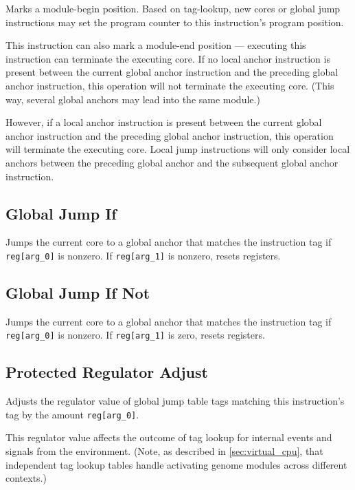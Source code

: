 
Marks a module-begin position.
Based on tag-lookup, new cores or global jump instructions may set the program counter to this instruction's program position.

This instruction can also mark a module-end position --- executing this instruction can terminate the executing core.
If no local anchor instruction is present between the current global anchor instruction and the preceding global anchor instruction, this operation will not terminate the executing core.
(This way, several global anchors may lead into the same module.)

However, if a local anchor instruction is present between the current global anchor instruction and the preceding global anchor instruction, this operation will terminate the executing core.
Local jump instructions will only consider local anchors between the preceding global anchor and the subsequent global anchor instruction.

\subsection{Global Jump If}


Jumps the current core to a global anchor that matches the instruction tag if \texttt{reg[arg\_0]} is nonzero.
If \texttt{reg[arg\_1]} is nonzero, resets registers.

\subsection{Global Jump If Not}


Jumps the current core to a global anchor that matches the instruction tag if \texttt{reg[arg\_0]} is nonzero.
If \texttt{reg[arg\_1]} is zero, resets registers.

\subsection{Protected Regulator Adjust}


Adjusts the regulator value of global jump table tags matching this instruction's tag by the amount \texttt{reg[arg\_0]}.

This regulator value affects the outcome of tag lookup for internal events and signals from the environment.
(Note, as described in \ref{sec:virtual_cpu}, that independent tag lookup tables handle activating genome modules across different contexts.)

